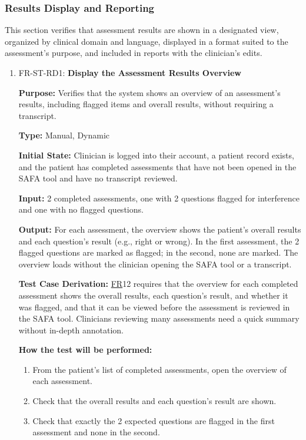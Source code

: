 \documentclass[12pt, titlepage]{article}
\newcommand{\srsfr}[1]{\href{https://github.com/Nour-Fawaz/MacaBoca/blob/main/pdfs/SRS/SRS.pdf}{FR}}
\renewcommand{\_}{\oldunderscore\allowbreak}
\begin{document}
\subsubsection{Results Display and Reporting}
This section verifies that assessment results are shown in a designated view, organized by clinical domain and language, displayed in a format suited to the assessment's purpose, and included in reports with the clinician's edits.
\begin{enumerate}
  \item FR-ST-RD1: \textbf{Display the Assessment Results Overview\\}
  \begin{mdframed}[linewidth=0.5mm]
      \textbf{Purpose:} Verifies that the system shows an overview of an assessment's results, including flagged items and overall results, without requiring a transcript. \par
      \textbf{Type:} Manual, Dynamic \par
      \textbf{Initial State:} Clinician is logged into their account, a patient record exists, and the patient has completed assessments that have not been opened in the SAFA tool and have no transcript reviewed. \par
      \textbf{Input:} 2 completed assessments, one with 2 questions flagged for interference and one with no flagged questions. \par
      \textbf{Output:} For each assessment, the overview shows the patient's overall results and each question's result (e.g., right or wrong). In the first assessment, the 2 flagged questions are marked as flagged; in the second, none are marked. The overview loads without the clinician opening the SAFA tool or a transcript. \par
      \textbf{Test Case Derivation:} \srsfr*{12} requires that the overview for each completed assessment shows the overall results, each question's result, and whether it was flagged, and that it can be viewed before the assessment is reviewed in the SAFA tool. Clinicians reviewing many assessments need a quick summary without in-depth annotation. \par
      \textbf{How the test will be performed:}
      \begin{enumerate}
        \item[1.] From the patient's list of completed assessments, open the overview of each assessment.
        \item[2.] Check that the overall results and each question's result are shown.
        \item[3.] Check that exactly the 2 expected questions are flagged in the first assessment and none in the second.
      \end{enumerate}
  \end{mdframed}


\end{enumerate}
\end{document}
